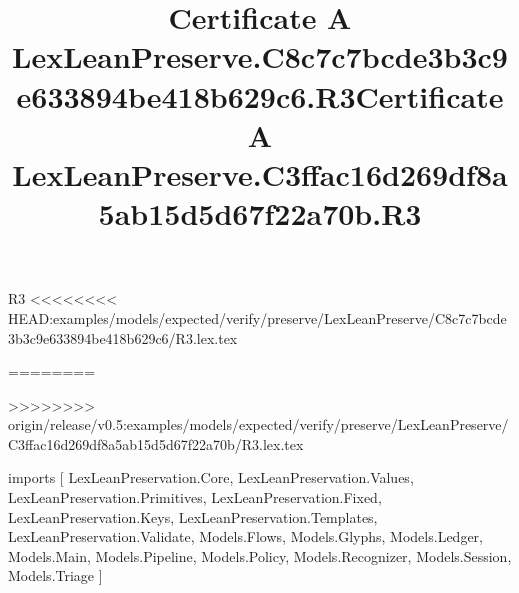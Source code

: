 \begin{lexlean}{R3}
<<<<<<<< HEAD:examples/models/expected/verify/preserve/LexLeanPreserve/C8c7c7bcde3b3c9e633894be418b629c6/R3.lex.tex
\title{Certificate A LexLeanPreserve.C8c7c7bcde3b3c9e633894be418b629c6.R3}
========
\title{Certificate A LexLeanPreserve.C3ffac16d269df8a5ab15d5d67f22a70b.R3}
>>>>>>>> origin/release/v0.5:examples/models/expected/verify/preserve/LexLeanPreserve/C3ffac16d269df8a5ab15d5d67f22a70b/R3.lex.tex
\begin{coremodule}
imports [
  LexLeanPreservation.Core,
  LexLeanPreservation.Values,
  LexLeanPreservation.Primitives,
  LexLeanPreservation.Fixed,
  LexLeanPreservation.Keys,
  LexLeanPreservation.Templates,
  LexLeanPreservation.Validate,
  Models.Flows,
  Models.Glyphs,
  Models.Ledger,
  Models.Main,
  Models.Pipeline,
  Models.Policy,
  Models.Recognizer,
  Models.Session,
  Models.Triage
]


\end{coremodule}
\end{lexlean}
